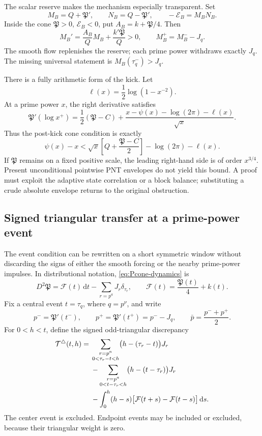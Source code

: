 \documentclass[11pt,a4paper]{article}
\numberwithin{equation}{section}
\theoremstyle{definition}
\newcommand{\dd}{\,\mathrm{d}}
\begin{document}
The scalar reserve makes the mechanism especially transparent.  Set
\[
  M_B=Q+\mathfrak P',
  \qquad
  N_B=Q-\mathfrak P',
  \qquad
  -\mathcal E_B=M_BN_B.
\]
Inside the cone \(\mathfrak P>0\), \(\mathcal E_B<0\), put
\(A_B=k+\mathfrak P/4\).  Then
\begin{equation}\label{eq:reserve-flow}
  \boxed{
  M_B'=\frac{A_B}{Q}M_B+\frac{k'\mathfrak P}{Q}>0,
  \qquad
  M_B^+=M_B^--J_q.
  }
\end{equation}
The smooth flow replenishes the reserve; each prime power withdraws exactly
\(J_q\).  The missing universal statement is \(M_B(\tau_q^-)>J_q\).

There is a fully arithmetic form of the kick.  Let
\[
  \ell(x)=\frac12\log(1-x^{-2}).
\]
At a prime power \(x\), the right derivative satisfies
\[
  \mathfrak P'(\log x^+)
  =\frac12(\mathfrak P-C)
  +\frac{x-\psi(x)-\log(2\pi)-\ell(x)}{\sqrt{x}}.
\]
Thus the post-kick cone condition is exactly
\begin{equation}\label{eq:kick-arithmetic-form}
  \psi(x)-x
  <\sqrt{x}\left[Q+\frac{\mathfrak P-C}{2}\right]
  -\log(2\pi)-\ell(x).
\end{equation}
If \(\mathfrak P\) remains on a fixed positive scale, the leading right-hand
side is of order \(x^{3/4}\).  Present unconditional pointwise PNT envelopes
do not yield this bound.  A proof must exploit the adaptive state correlation
or a block balance; substituting a crude absolute envelope returns to the
original obstruction.

\subsection{Signed triangular transfer at a prime-power event}

The event condition can be rewritten on a short symmetric window without
discarding the signs of either the smooth forcing or the nearby prime-power
impulses.  In distributional notation, \eqref{eq:Pcone-dynamics} is
\begin{equation}\label{eq:Pcone-distributional-measure}
  D^2\mathfrak P
  =\mathcal F(t)\dd t-\sum_{r=p^a}J_r\delta_{\tau_r},
  \qquad
  \mathcal F(t)=\frac{\mathfrak P(t)}4+k(t).
\end{equation}
Fix a central event \(t=\tau_q\), where \(q=p^\nu\), and write
\[
  p^- =\mathfrak P'(t^-),
  \qquad
  p^+ =\mathfrak P'(t^+)=p^--J_q,
  \qquad
  \bar p=\frac{p^-+p^+}{2}.
\]
For \(0<h<t\), define the signed odd-triangular discrepancy
\begin{align}
 \mathcal T^\triangle(t,h)={}&
 \sum_{\substack{r=p^a\\0<\tau_r-t<h}}
   \bigl(h-(\tau_r-t)\bigr)J_r
 \notag\\
 &-\sum_{\substack{r=p^a\\0<t-\tau_r<h}}
   \bigl(h-(t-\tau_r)\bigr)J_r
 \notag\\
 &-\int_0^h(h-s)
   \bigl[\mathcal F(t+s)-\mathcal F(t-s)\bigr]\dd s.
 \label{eq:signed-triangular-definition}
\end{align}
The center event is excluded.  Endpoint events may be included or excluded,
because their triangular weight is zero.
\end{document}
